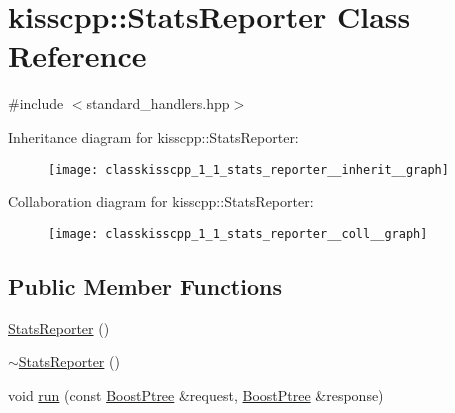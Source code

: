 \hypertarget{classkisscpp_1_1_stats_reporter}{\section{kisscpp\-:\-:Stats\-Reporter Class Reference}
\label{classkisscpp_1_1_stats_reporter}
}


{\ttfamily \#include $<$standard\-\_\-handlers.\-hpp$>$}



Inheritance diagram for kisscpp\-:\-:Stats\-Reporter\-:
\nopagebreak
\begin{figure}[H]
\begin{center}
\leavevmode
\texttt{[image: classkisscpp\_1\_1\_stats\_reporter\_\_inherit\_\_graph]}
\end{center}
\end{figure}


Collaboration diagram for kisscpp\-:\-:Stats\-Reporter\-:
\nopagebreak
\begin{figure}[H]
\begin{center}
\leavevmode
\texttt{[image: classkisscpp\_1\_1\_stats\_reporter\_\_coll\_\_graph]}
\end{center}
\end{figure}
\subsection*{Public Member Functions}
\begin{DoxyCompactItemize}
\item 
\hyperlink{classkisscpp_1_1_stats_reporter_a07215d1f69aabea8e60a49a930d11401}{Stats\-Reporter} ()
\item 
\hyperlink{classkisscpp_1_1_stats_reporter_a147cf5af12711d7cc5617d6538724e07}{$\sim$\-Stats\-Reporter} ()
\item 
void \hyperlink{classkisscpp_1_1_stats_reporter_af57d8c01b118a4693b8b226c3f9dbbe5}{run} (const \hyperlink{boost__ptree_8hpp_ab36820650b8e0db36402aea80485633c}{Boost\-Ptree} \&request, \hyperlink{boost__ptree_8hpp_ab36820650b8e0db36402aea80485633c}{Boost\-Ptree} \&response)
\end{DoxyCompactItemize}


